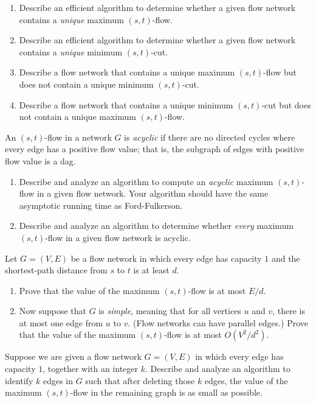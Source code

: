 \begin{exercises}
\item
\begin{enumerate}
\item Describe an efficient algorithm to determine whether a given flow network contains a \textit{unique} maximum $(s,t)$-flow.
\item Describe an efficient algorithm to determine whether a given flow network contains a \textit{unique} minimum $(s,t)$-cut.
\item Describe a flow network that contains a unique maximum $(s,t)$-flow but does not contain a unique minimum $(s,t)$-cut.
\item Describe a flow network that contains a unique minimum $(s,t)$-cut but does not contain a unique maximum $(s,t)$-flow.
\end{enumerate}

\item An $(s,t)$-flow in a network $G$ is \textit{acyclic} if there are no directed cycles where every edge has a positive flow value; that is, the subgraph of edges with positive flow value is a dag.
\begin{enumerate}
\item Describe and analyze an algorithm to compute an \textit{acyclic} maximum $(s,t)$-flow in a given flow network.
Your algorithm should have the same asymptotic running time as Ford-Fulkerson.
\item Describe and analyze an algorithm to determine whether \textit{every} maximum $(s,t)$-flow in a given flow network is acyclic.
\end{enumerate}

\item Let $G = (V,E)$ be a flow network in which every edge has capacity $1$ and the shortest-path distance from $s$ to $t$ is at least $d$.
\begin{enumerate}
\item Prove that the value of the maximum $(s,t)$-flow is at most $E/d$.
\item Now suppose that $G$ is \textit{simple}, meaning that for all vertices $u$ and $v$, there is at most one edge from $u$ to $v$.
(Flow networks can have parallel edges.)
Prove that the value of the maximum $(s,t)$-flow is at most $O(V^2/d^2)$.
\end{enumerate}

\item Suppose we are given a flow network $G = (V,E)$ in which every edge has capacity $1$, together with an integer $k$.
Describe and analyze an algorithm to identify $k$ edges in $G$ such that after deleting those $k$ edges, the value of the maximum $(s,t)$-flow in the remaining graph is as small as possible.


\end{exercises}
